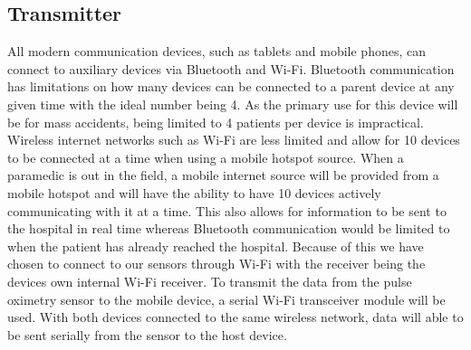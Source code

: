\documentclass{article}
\begin{document}
\subsection{Transmitter}
All modern communication devices, such as tablets and mobile phones, can connect to auxiliary devices via Bluetooth and Wi-Fi. Bluetooth communication has 
limitations on how many devices can be connected to a parent device at any given time with the ideal number being 4. \cite{apple1} As the primary use for this device
 will be for mass accidents, being limited to 4 patients per device is impractical. Wireless internet networks such as Wi-Fi are less limited and allow for 
 10 devices to be connected at a time when using a mobile hotspot source. \cite{} When a paramedic is out in the field, a mobile internet source will be provided
 from a mobile hotspot and will have the ability to have 10 devices actively communicating with it at a time. This also allows for information to be sent to 
 the hospital in real time whereas Bluetooth communication would be limited to when the patient has already reached the hospital. Because of this we have 
 chosen to connect to our sensors through Wi-Fi with the receiver being the devices own internal Wi-Fi receiver. 
To transmit the data from the pulse oximetry sensor to the mobile device, a serial Wi-Fi transceiver module will be used. With both devices connected to 
the same wireless network, data will able to be sent serially from the sensor to the host device.  
\end{document}

